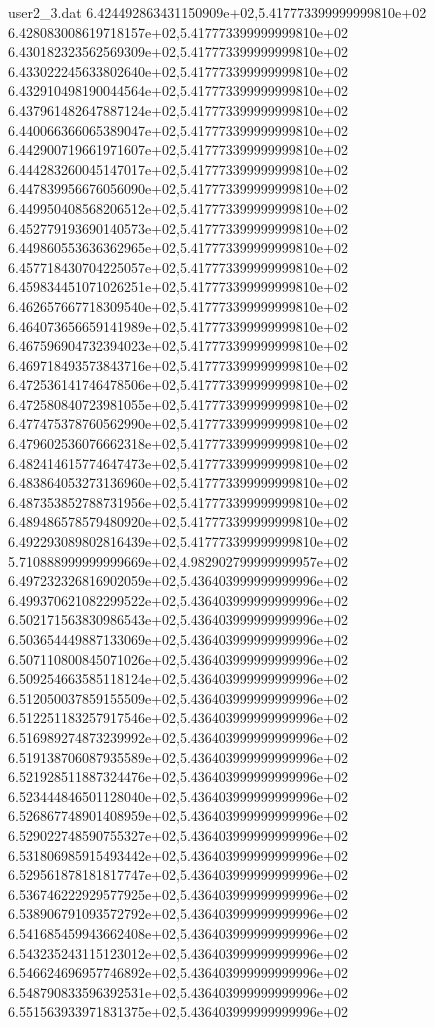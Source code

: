 \begin{filecontents}{user2_3.dat}
6.424492863431150909e+02,5.417773399999999810e+02
6.428083008619718157e+02,5.417773399999999810e+02
6.430182323562569309e+02,5.417773399999999810e+02
6.433022245633802640e+02,5.417773399999999810e+02
6.432910498190044564e+02,5.417773399999999810e+02
6.437961482647887124e+02,5.417773399999999810e+02
6.440066366065389047e+02,5.417773399999999810e+02
6.442900719661971607e+02,5.417773399999999810e+02
6.444283260045147017e+02,5.417773399999999810e+02
6.447839956676056090e+02,5.417773399999999810e+02
6.449950408568206512e+02,5.417773399999999810e+02
6.452779193690140573e+02,5.417773399999999810e+02
6.449860553636362965e+02,5.417773399999999810e+02
6.457718430704225057e+02,5.417773399999999810e+02
6.459834451071026251e+02,5.417773399999999810e+02
6.462657667718309540e+02,5.417773399999999810e+02
6.464073656659141989e+02,5.417773399999999810e+02
6.467596904732394023e+02,5.417773399999999810e+02
6.469718493573843716e+02,5.417773399999999810e+02
6.472536141746478506e+02,5.417773399999999810e+02
6.472580840723981055e+02,5.417773399999999810e+02
6.477475378760562990e+02,5.417773399999999810e+02
6.479602536076662318e+02,5.417773399999999810e+02
6.482414615774647473e+02,5.417773399999999810e+02
6.483864053273136960e+02,5.417773399999999810e+02
6.487353852788731956e+02,5.417773399999999810e+02
6.489486578579480920e+02,5.417773399999999810e+02
6.492293089802816439e+02,5.417773399999999810e+02
5.710888999999999669e+02,4.982902799999999957e+02
6.497232326816902059e+02,5.436403999999999996e+02
6.499370621082299522e+02,5.436403999999999996e+02
6.502171563830986543e+02,5.436403999999999996e+02
6.503654449887133069e+02,5.436403999999999996e+02
6.507110800845071026e+02,5.436403999999999996e+02
6.509254663585118124e+02,5.436403999999999996e+02
6.512050037859155509e+02,5.436403999999999996e+02
6.512251183257917546e+02,5.436403999999999996e+02
6.516989274873239992e+02,5.436403999999999996e+02
6.519138706087935589e+02,5.436403999999999996e+02
6.521928511887324476e+02,5.436403999999999996e+02
6.523444846501128040e+02,5.436403999999999996e+02
6.526867748901408959e+02,5.436403999999999996e+02
6.529022748590755327e+02,5.436403999999999996e+02
6.531806985915493442e+02,5.436403999999999996e+02
6.529561878181817747e+02,5.436403999999999996e+02
6.536746222929577925e+02,5.436403999999999996e+02
6.538906791093572792e+02,5.436403999999999996e+02
6.541685459943662408e+02,5.436403999999999996e+02
6.543235243115123012e+02,5.436403999999999996e+02
6.546624696957746892e+02,5.436403999999999996e+02
6.548790833596392531e+02,5.436403999999999996e+02
6.551563933971831375e+02,5.436403999999999996e+02

\end{filecontents}
